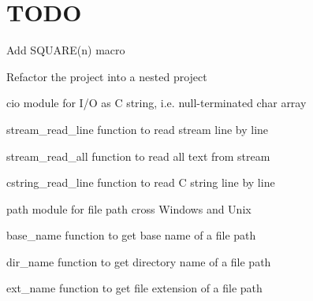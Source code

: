 \chapter{TODO }
\hypertarget{md_TODO}{}\label{md_TODO}

\begin{DoxyItemize}
\item Add {\ttfamily SQUARE(n)} macro
\item Refactor the project into a nested project
\item {\ttfamily cio} module for I/O as C string, i.\+e. null-\/terminated {\ttfamily char} array
\begin{DoxyItemize}
\item {\ttfamily stream\+\_\+read\+\_\+line} function to read stream line by line
\item {\ttfamily stream\+\_\+read\+\_\+all} function to read all text from stream
\item {\ttfamily cstring\+\_\+read\+\_\+line} function to read C string line by line
\end{DoxyItemize}
\item {\ttfamily path} module for file path cross Windows and Unix
\begin{DoxyItemize}
\item {\ttfamily base\+\_\+name} function to get base name of a file path
\item {\ttfamily dir\+\_\+name} function to get directory name of a file path
\item {\ttfamily ext\+\_\+name} function to get file extension of a file path 
\end{DoxyItemize}
\end{DoxyItemize}